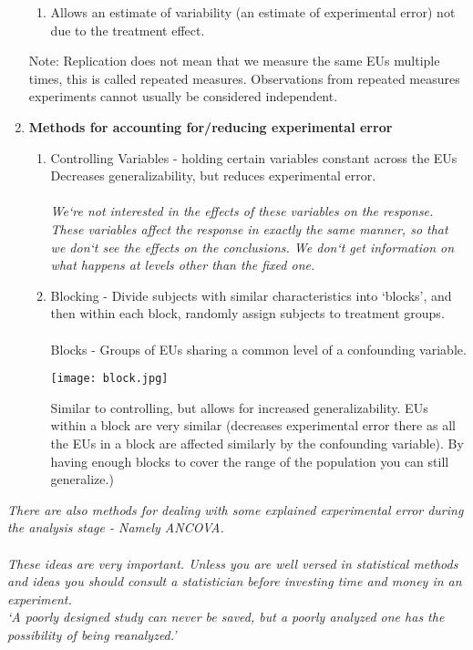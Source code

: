 \documentclass{report}
\begin{document}
\begin{enumerate}
\begin{enumerate}
				\item Allows an estimate of variability (an estimate of experimental error) not due to the treatment effect.
			\end{enumerate}
Note: Replication does not mean that we measure the same EUs multiple times, this is called repeated measures.  Observations from repeated measures experiments cannot 	usually be considered independent.
\newpage
		\item \textbf{Methods for accounting for/reducing experimental error}
		\begin{enumerate}
			\item Controlling Variables - holding certain variables constant across the EUs\\
			Decreases generalizability, but reduces experimental error.\\~\\
\noindent\textit{We`re not interested in the effects of these variables on the response.  These variables affect the response in exactly the same manner, so that we	don`t see the effects on the conclusions. We don`t get information on what happens at levels other than the fixed one.}
		\item Blocking - Divide subjects with similar characteristics into `blocks', and then within each block, randomly assign subjects to treatment groups.\\~\\
			Blocks - Groups of EUs sharing a common level of a confounding variable.\\
\begin{center}
\texttt{[image: block.jpg]}
\end{center}
			Similar to controlling, but allows for increased generalizability.  EUs within a block are very similar (decreases experimental error there as all the EUs in a block are affected similarly by the confounding variable).  By having enough blocks to cover the range of the population you can still generalize.)
		\end{enumerate}
	\end{enumerate}
		\noindent\textit{There are also methods for dealing with some explained experimental error during the analysis stage - Namely ANCOVA.\\~\\
		These ideas are very important.  Unless you are well versed in statistical methods and ideas you should consult a statistician before investing time and money in an experiment.\\
`A poorly designed study can never be saved, but a poorly analyzed one has the possibility of being reanalyzed.'}
\end{document}

